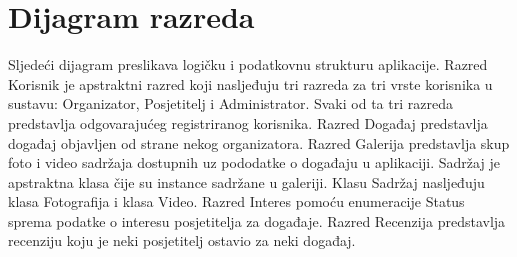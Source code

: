 			
		\section{Dijagram razreda}
		
		

		
			Sljedeći dijagram preslikava logičku i podatkovnu strukturu aplikacije. Razred Korisnik je apstraktni razred koji nasljeđuju tri razreda za tri vrste korisnika u sustavu: Organizator, Posjetitelj i Administrator. Svaki od ta tri razreda predstavlja odgovarajućeg registriranog korisnika. Razred Događaj predstavlja događaj objavljen od strane nekog organizatora. Razred Galerija predstavlja skup foto i video sadržaja dostupnih uz pododatke o događaju u aplikaciji. Sadržaj je apstraktna  klasa čije su instance sadržane u galeriji. Klasu Sadržaj nasljeđuju klasa Fotografija i klasa Video. Razred Interes pomoću enumeracije Status sprema podatke o interesu posjetitelja za događaje. Razred Recenzija predstavlja recenziju koju je neki posjetitelj ostavio za neki događaj.
		
